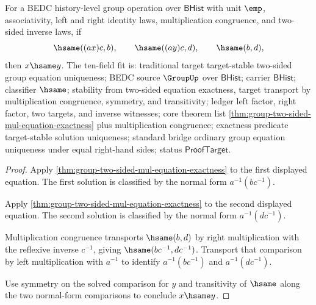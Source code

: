\begin{theorem}
\label{thm:group-two-sided-mul-equation-target-stable-unique}
For a BEDC history-level group operation over $\mathsf{BHist}$ with unit
$\emp$, associativity, left and right identity laws, multiplication congruence,
and two-sided inverse laws, if
$$
\hsame((a x)c,b),
\qquad
\hsame((a y)c,d),
\qquad
\hsame(b,d),
$$
then $x\hsame y$.
The ten-field fit is: traditional target target-stable two-sided group
equation uniqueness; BEDC source $\GroupUp$ over $\mathsf{BHist}$; carrier
$\mathsf{BHist}$; classifier $\hsame$; stability from two-sided equation
exactness, target transport by multiplication congruence, symmetry, and
transitivity; ledger left factor, right factor, two targets, and inverse
witnesses; core theorem list
\autoref{thm:group-two-sided-mul-equation-exactness} plus multiplication
congruence; exactness predicate target-stable solution uniqueness; standard
bridge ordinary group equation uniqueness under equal right-hand sides; status
$\mathsf{ProofTarget}$.
\end{theorem}
\begin{proof}
Apply \autoref{thm:group-two-sided-mul-equation-exactness} to the first
displayed equation. The first solution is classified by the normal form
$a^{-1}(b c^{-1})$.

Apply \autoref{thm:group-two-sided-mul-equation-exactness} to the second
displayed equation. The second solution is classified by the normal form
$a^{-1}(d c^{-1})$.

Multiplication congruence transports $\hsame(b,d)$ by right multiplication with
the reflexive inverse $c^{-1}$, giving $\hsame(b c^{-1},d c^{-1})$. Transport
that comparison by left multiplication with $a^{-1}$ to identify
$a^{-1}(b c^{-1})$ and $a^{-1}(d c^{-1})$.

Use symmetry on the solved comparison for $y$ and transitivity of $\hsame$ along
the two normal-form comparisons to conclude $x\hsame y$.
\end{proof}

